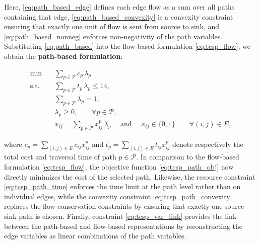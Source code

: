 \documentclass{book}
\theoremstyle{definition}
\numberwithin{algorithm_}{chapter}
\begin{document}
Here, \eqref{eq:path_based_edge} defines each edge flow as a sum over all paths containing that edge, \eqref{eq:path_based_convexity} is a convexity constraint ensuring that exactly one unit of flow is sent from source to sink, and \eqref{eq:path_based_nonneg} enforces non-negativity of the path variables. Substituting \eqref{eq:path_based} into the flow-based formulation \eqref{eq:tcsp_flow}, we obtain the \textbf{path-based formulation}:

\begin{subequations}\label{eq:tcsp_path_final}
\begin{align}
\min \quad & \sum_{p \in \mathcal{P}} c_p \, \lambda_p \label{eq:tcsp_path_obj} \\[2mm]
\text{s.t.} \quad 
& \sum_{p \in \mathcal{P}} t_p \, \lambda_p \le 14, \label{eq:tcsp_path_time} \\[1mm]
& \sum_{p \in \mathcal{P}} \lambda_p = 1, \label{eq:tcsp_path_convexity} \\[1mm]
& \lambda_p \ge 0, \qquad \forall p \in \mathcal{P}, \label{eq:tcsp_path_nonneg} \\[2mm]
& x_{ij} = \sum_{p \in \mathcal{P}} x^p_{ij} \, \lambda_p \quad \text{ and } \quad x_{ij} \in \{0, 1\} \qquad \forall (i,j) \in E, \label{eq:tcsp_var_link}
\end{align}
\end{subequations}

where $c_p = \sum_{(i,j)\in E} c_{ij} x^p_{ij}$ and $t_p = \sum_{(i,j)\in E} t_{ij} x^p_{ij}$ denote respectively the total cost and traversal time of path $p \in \mathcal{P}$. In comparison to the flow-based formulation \eqref{eq:tcsp_flow}, the objective function \eqref{eq:tcsp_path_obj} now directly minimizes the cost of the selected path. Likewise, the resource constraint \eqref{eq:tcsp_path_time} enforces the time limit at the path level rather than on individual edges, while the convexity constraint \eqref{eq:tcsp_path_convexity} replaces the flow-conservation constraints by ensuring that exactly one source--sink path is chosen. Finally, constraint \eqref{eq:tcsp_var_link} provides the link between the path-based and flow-based representations by reconstructing the edge variables as linear combinations of the path variables.
\end{document}

